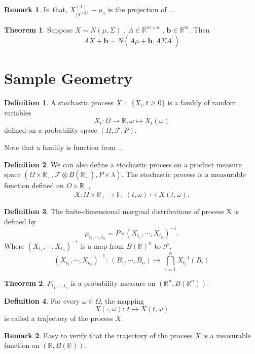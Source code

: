 \documentclass[12pt]{book}
\theoremstyle{definition}
\newtheorem{definition}{Definition}[chapter]
\newtheorem{theorem}{Theorem}[chapter]
\newtheorem{remark}{Remark}
\newcommand{\R}{\mathbb{R}}
\newcommand{\F}{\mathbb{F}}
\begin{document}
\begin{remark}
In that, $X^{(1)}_{|X^{(2)}}-\mu_1$ is the projection of ...
\end{remark}








\begin{theorem}
Suppose $X \sim N(\mathbb \mu,\Sigma)$ , $A \in \mathbb{R}^{m \times n}$	, $\mathbf{b} \in \mathbb{R}^m$. Then 
$$
AX+\mathbf{b} \sim N(A\mu+\mathbf{b},A \Sigma A^\prime)
$$

\end{theorem}

\section{Sample Geometry}



\begin{definition}
A stochastic process $X = \{X_t, t \geq 0\}$ is a famlily of random variables 
$$
X_t: \Omega \to \R, \omega \mapsto X_t(\omega)
$$
defined on a probability space $(\Omega,\mathcal{F},P)$.
\end{definition}
Note that a famlily is function from ...




\begin{definition}
We can also define a stochastic process on a product measure space $(\Omega \times \R_+, \mathcal F \otimes B(\R_+), P\times \lambda)$.
The stochastic process is a measurable function defined on $\Omega \times \R_+$,
$$
X: \Omega \times \R_+ \to \F, \ (t,\omega) \mapsto X(t,\omega).
$$
	
\end{definition}


\begin{definition}
The finite-dimensional marginal distributions of process X is defined by 
$$
\mu_{t_1,\cdots,t_n} = P \circ (X_{t_1},\cdots,X_{t_n})^{-1}.
$$	
Where $(X_{t_1},\cdots,X_{t_n})^{-1}$  is a map from $B(\R)^n$ to $\mathcal F$,
$$
(X_{t_1},\cdots,X_{t_n})^{-1}: \ (B_1,\cdots,B_n) \mapsto \ \bigcap_{i=1}^n X_{t_i}^{-1}(B_i)
$$
\end{definition}

\begin{theorem}
$P_{t_1,\cdots,t_n}$ is a probability measure on $(\R^n,B(\R^n))$.
\end{theorem}

\begin{definition}
For every $\omega \in \Omega$, the mapping 
$$
X(\cdot,\omega):\ t \mapsto X(t,\omega)
$$
is called a trajectory of the process $X$.
\end{definition}
\begin{remark}
Easy to verify that the trajectory of the process $X$ is a measurable function on $(\R,B(\R))$. 
\end{remark}
\end{document}

